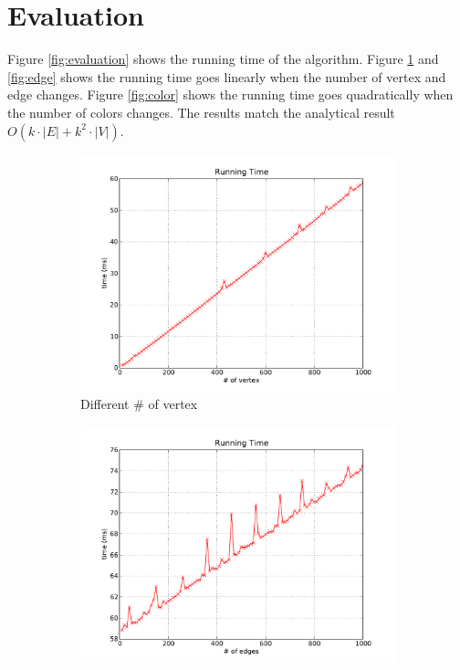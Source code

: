\documentclass[11pt,letterpaper,oneside]{article}
\begin{document}
\section{Evaluation}
\label{sec:evaluation}
Figure \ref{fig:evaluation} shows the running time of the algorithm. Figure \ref{fig:vertex} and \ref{fig:edge} shows the running time goes linearly when the number of vertex and edge changes. Figure \ref{fig:color} shows the running time goes quadratically when the number of colors changes. The results match the analytical result $O(k\cdot|E|+k^2\cdot|V|)$.

\begin{figure}
  \centering
  \begin{subfigure}[b]{0.3\textwidth}
    \centering
    \includegraphics[width=\textwidth]{fig1}
    \caption{Different \# of vertex}
    \label{fig:vertex}
  \end{subfigure}%
  \begin{subfigure}[b]{0.3\textwidth}
    \centering
    \includegraphics[width=\textwidth]{fig2}

\end{subfigure}
\end{figure}
\end{document}
